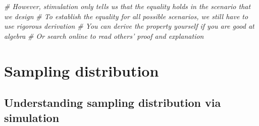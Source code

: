 \documentclass[12pt,]{book}
\newenvironment{Shaded}{\begin{snugshade}}{\end{snugshade}}
\newcommand{\KeywordTok}[1]{\textcolor[rgb]{0.13,0.29,0.53}{\textbf{#1}}}
\newcommand{\DataTypeTok}[1]{\textcolor[rgb]{0.13,0.29,0.53}{#1}}
\newcommand{\DecValTok}[1]{\textcolor[rgb]{0.00,0.00,0.81}{#1}}
\newcommand{\CommentTok}[1]{\textcolor[rgb]{0.56,0.35,0.01}{\textit{#1}}}
\newcommand{\ControlFlowTok}[1]{\textcolor[rgb]{0.13,0.29,0.53}{\textbf{#1}}}
\newcommand{\OperatorTok}[1]{\textcolor[rgb]{0.81,0.36,0.00}{\textbf{#1}}}
\newcommand{\NormalTok}[1]{#1}
\begin{document}
\begin{Shaded}
\begin{Highlighting}[]
\CommentTok{# However, stimulation only tells us that the equality holds in the scenario that we design}
\CommentTok{# To establish the equality for all possible scenarios, we still have to use rigorous derivation }
\CommentTok{# You can derive the property yourself if you are good at algebra }
\CommentTok{# Or search online to read others' proof and explanation}
\end{Highlighting}
\end{Shaded}

\begin{Shaded}
\end{Shaded}

\chapter{Sampling distribution}\label{ch:sampling}

\section{Understanding sampling distribution via
simulation}\label{understanding-sampling-distribution-via-simulation}
\end{document}
